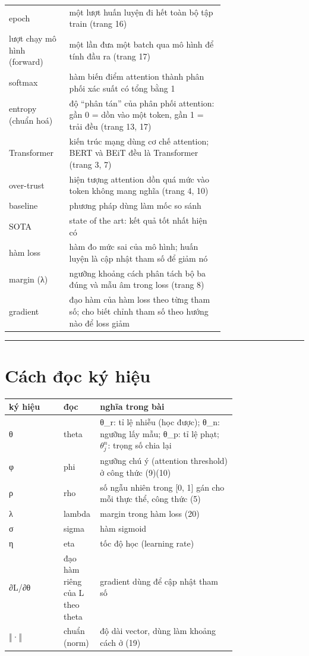 \documentclass[11pt,a4paper]{article}
\begin{document}
\begin{center}
\begin{tabular}{@{}lp{0.72\linewidth}@{}}
epoch & một lượt huấn luyện đi hết toàn bộ tập train (trang 16) \\
lượt chạy mô hình (forward) & một lần đưa một batch qua mô hình để tính đầu ra (trang 17) \\
softmax & hàm biến điểm attention thành phân phối xác suất có tổng bằng 1 \\
entropy (chuẩn hoá) & độ ``phân tán'' của phân phối attention: gần 0 = dồn vào một token, gần 1 = trải đều (trang 13, 17) \\
Transformer & kiến trúc mạng dùng cơ chế attention; BERT và BEiT đều là Transformer (trang 3, 7) \\
over-trust & hiện tượng attention dồn quá mức vào token không mang nghĩa (trang 4, 10) \\
baseline & phương pháp dùng làm mốc so sánh \\
SOTA & state of the art: kết quả tốt nhất hiện có \\
hàm loss & hàm đo mức sai của mô hình; huấn luyện là cập nhật tham số để giảm nó \\
margin (λ) & ngưỡng khoảng cách phân tách bộ ba đúng và mẫu âm trong loss (trang 8) \\
gradient & đạo hàm của hàm loss theo từng tham số; cho biết chỉnh tham số theo hướng nào để loss giảm \\
\bottomrule
\end{tabular}
\end{center}

\medskip\noindent\rule{\linewidth}{0.3pt}\medskip

\newpage
\section*{Cách đọc ký hiệu}

\begin{center}\small
\begin{tabular}{@{}lp{0.16\linewidth}p{0.6\linewidth}@{}}
\toprule
\textbf{ký hiệu} & \textbf{đọc} & \textbf{nghĩa trong bài} \\ \midrule
θ & theta & θ\_r: tỉ lệ nhiễu (học được); θ\_n: ngưỡng lấy mẫu; θ\_p: tỉ lệ phạt; $\theta^n_j$: trọng số chia lại \\
φ & phi & ngưỡng chú ý (attention threshold) ở công thức (9)(10) \\
ρ & rho & số ngẫu nhiên trong [0, 1] gán cho mỗi thực thể, công thức (5) \\
λ & lambda & margin trong hàm loss (20) \\
σ & sigma & hàm sigmoid \\
η & eta & tốc độ học (learning rate) \\
∂L/∂θ & đạo hàm riêng của L theo theta & gradient dùng để cập nhật tham số \\
‖·‖ & chuẩn (norm) & độ dài vector, dùng làm khoảng cách ở (19) \\
\bottomrule
\end{tabular}
\end{center}
\end{document}
